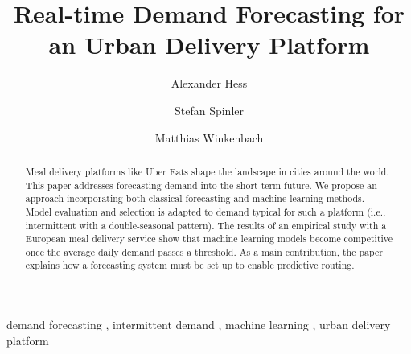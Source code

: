 \begin{frontmatter}

\title{Real-time Demand Forecasting for an Urban Delivery Platform}

\author[WHU]{Alexander Hess}
\author[WHU]{Stefan Spinler}
\author[MIT]{Matthias Winkenbach}
\address[WHU]{
WHU - Otto Beisheim School of Management,
Burgplatz 2, 56179 Vallendar, Germany
}
\address[MIT]{
Massachusetts Institute of Technology,
77 Massachusetts Avenue, Cambridge, MA 02139, United States
}

\begin{abstract}
Meal delivery platforms like Uber Eats shape the landscape in cities around the world.
This paper addresses forecasting demand into the short-term future.
We propose an approach incorporating
    both classical forecasting
    and machine learning methods.
Model evaluation and selection is adapted to demand typical for such a platform
    (i.e., intermittent with a double-seasonal pattern).
The results of an empirical study with a European meal delivery service show
    that machine learning models become competitive
    once the average daily demand passes a threshold.
As a main contribution, the paper explains
    how a forecasting system must be set up
    to enable predictive routing.
\end{abstract}

\begin{keyword}
demand forecasting \sep
intermittent demand \sep
machine learning \sep
urban delivery platform
\end{keyword}

\end{frontmatter}